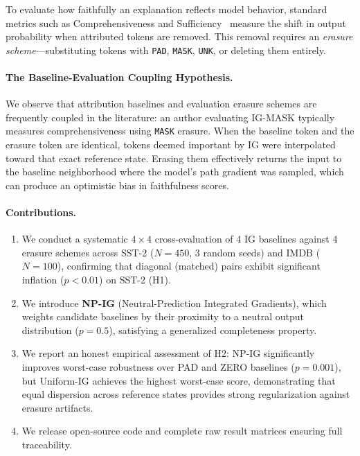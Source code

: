 \documentclass[11pt]{article}
\newcommand{\igmask}{IG-MASK}
\begin{document}
To evaluate how faithfully an explanation reflects model behavior, standard metrics such as Comprehensiveness and Sufficiency~\citep{deyoung2020eraser} measure the shift in output probability when attributed tokens are removed. This removal requires an \emph{erasure scheme}---substituting tokens with \texttt{PAD}, \texttt{MASK}, \texttt{UNK}, or deleting them entirely.

\paragraph{The Baseline-Evaluation Coupling Hypothesis.}
We observe that attribution baselines and evaluation erasure schemes are frequently coupled in the literature: an author evaluating \igmask{} typically measures comprehensiveness using \texttt{MASK} erasure. When the baseline token and the erasure token are identical, tokens deemed important by IG were interpolated toward that exact reference state. Erasing them effectively returns the input to the baseline neighborhood where the model's path gradient was sampled, which can produce an optimistic bias in faithfulness scores.

\paragraph{Contributions.}
\begin{enumerate}
    \item We conduct a systematic $4\times 4$ cross-evaluation of 4 IG baselines against 4 erasure schemes across SST-2 ($N=450$, 3 random seeds) and IMDB ($N=100$), confirming that diagonal (matched) pairs exhibit significant inflation ($p < 0.01$) on SST-2 (H1).
    \item We introduce \textbf{NP-IG} (Neutral-Prediction Integrated Gradients), which weights candidate baselines by their proximity to a neutral output distribution ($p=0.5$), satisfying a generalized completeness property.
    \item We report an honest empirical assessment of H2: NP-IG significantly improves worst-case robustness over PAD and ZERO baselines ($p=0.001$), but Uniform-IG achieves the highest worst-case score, demonstrating that equal dispersion across reference states provides strong regularization against erasure artifacts.
    \item We release open-source code and complete raw result matrices ensuring full traceability.
\end{enumerate}
\end{document}

